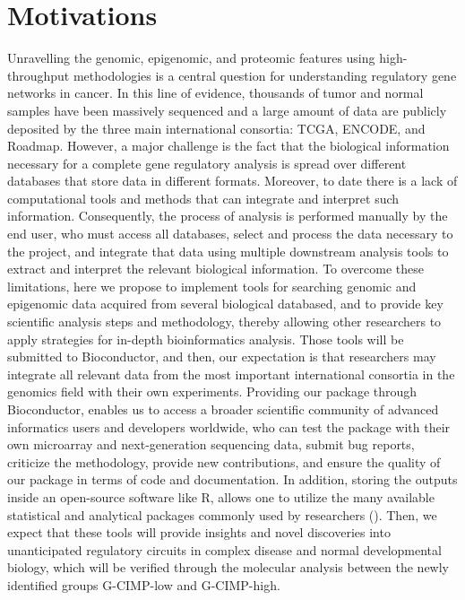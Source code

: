 \section{Motivations}


Unravelling the genomic, epigenomic, and proteomic features using high-throughput methodologies is a central question for understanding regulatory gene networks in cancer. In this line of evidence, thousands of tumor and normal samples have been massively sequenced and a large amount of data are publicly deposited by the three main international consortia: TCGA, ENCODE, and Roadmap. However, a major challenge is the fact that the biological information necessary for a complete gene regulatory analysis is spread over different databases that store data in different formats. Moreover, to date there is a lack of  computational tools and methods that can integrate and interpret such information. Consequently, the process of analysis is performed manually by the end user, who must access all databases, select and process the data necessary to the project, and integrate that data using multiple downstream analysis tools to extract and interpret the relevant biological information.
To overcome these limitations, here we propose to implement tools for searching genomic and epigenomic data acquired from several biological databased, and to provide key scientific analysis steps and methodology, thereby allowing other researchers to apply  strategies for in-depth bioinformatics analysis. Those tools will be submitted to Bioconductor, and then, our expectation is that researchers may integrate all relevant data from the most important international consortia in the genomics field with their own experiments. Providing our package through Bioconductor, enables us to access a broader scientific community of advanced informatics users and developers worldwide, who can test the package with their own microarray and next-generation sequencing data, submit bug reports, criticize the methodology, provide new contributions, and ensure the quality of our package in terms of code and documentation.  In addition, storing the outputs inside an open-source software like R, allows one to utilize the many available statistical and analytical packages commonly used by researchers (\citealp{creditcode}). Then, we expect that these tools will provide insights and novel discoveries into unanticipated regulatory circuits in complex disease and normal developmental biology, which will be verified through the molecular analysis between the newly identified groups G-CIMP-low and G-CIMP-high.


